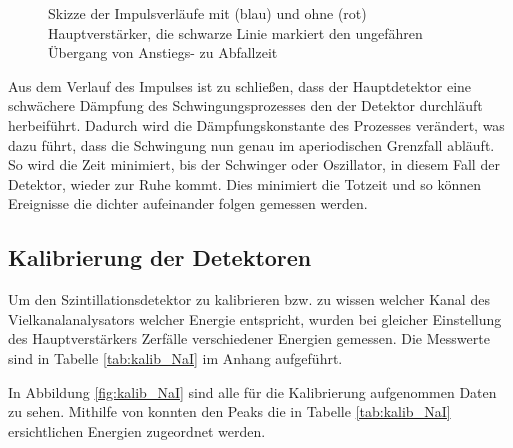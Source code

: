 \documentclass[
	parskip=half,10pt,
	numbers= noenddot, %
	toc=flat, %
	oneside,
	twocolumn,
	]{scrartcl}
\begin{document}
\begin{figure}[h]
\centering
{}
\caption{Skizze der Impulsverläufe mit (blau) und ohne (rot) Hauptverstärker, die schwarze Linie markiert den ungefähren Übergang von Anstiegs- zu Abfallzeit}
\label{fig:zeiten}
\end{figure}

Aus dem Verlauf des Impulses ist zu schließen, dass der Hauptdetektor eine schwächere Dämpfung des Schwingungsprozesses den der Detektor durchläuft 
herbeiführt. Dadurch wird die Dämpfungskonstante des Prozesses verändert, was dazu führt, dass die Schwingung nun genau im aperiodischen Grenzfall 
abläuft. So wird die Zeit minimiert, bis der Schwinger oder Oszillator, in diesem Fall der Detektor, wieder zur Ruhe kommt. Dies minimiert die 
Totzeit und so können Ereignisse die dichter aufeinander folgen gemessen werden.

\subsection{Kalibrierung der Detektoren}

Um den Szintillationsdetektor zu kalibrieren bzw. zu wissen welcher Kanal des Vielkanalanalysators welcher Energie entspricht, wurden bei gleicher 
Einstellung des Hauptverstärkers Zerfälle verschiedener Energien gemessen. Die Messwerte sind in Tabelle \ref{tab:kalib_NaI} im Anhang aufgeführt. 


In Abbildung \ref{fig:kalib_NaI} sind alle für die Kalibrierung aufgenommen Daten zu sehen. Mithilfe von \cite{kohlrausch} konnten den Peaks die in Tabelle 
\ref{tab:kalib_NaI} ersichtlichen Energien zugeordnet werden. 
\end{document}
